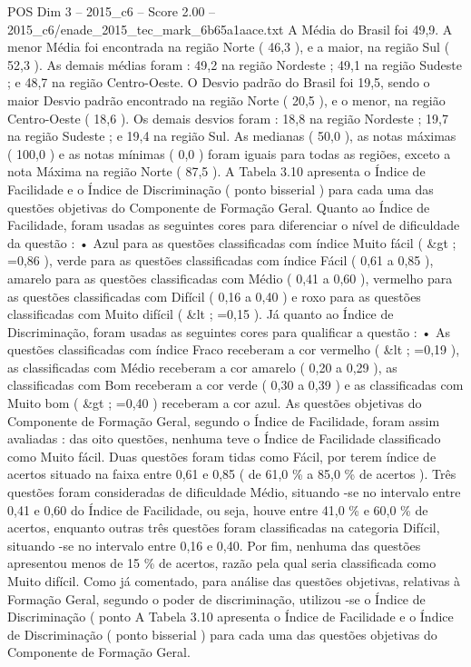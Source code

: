 \begin{textsample}{POS Dim 3 – 2015\_c6 – Score 2.00 – 2015\_c6/enade\_2015\_tec\_mark\_6b65a1aace.txt}
A Média do Brasil foi 49,9.
A menor Média foi encontrada na região Norte ( 46,3 ), e a maior, na região Sul ( 52,3 ).
As demais médias foram : 49,2 na região Nordeste ; 49,1 na região Sudeste ; e 48,7 na região Centro-Oeste.
O Desvio padrão do Brasil foi 19,5, sendo o maior Desvio padrão encontrado na região Norte ( 20,5 ), e o menor, na região Centro-Oeste ( 18,6 ).
Os demais desvios foram : 18,8 na região Nordeste ; 19,7 na região Sudeste ; e 19,4 na região Sul.
As medianas ( 50,0 ), as notas máximas ( 100,0 ) e as notas mínimas ( 0,0 ) foram iguais para todas as regiões, exceto a nota Máxima na região Norte ( 87,5 ).
A Tabela 3.10 apresenta o Índice de Facilidade e o Índice de Discriminação ( ponto bisserial ) para cada uma das questões objetivas do Componente de Formação Geral.
Quanto ao Índice de Facilidade, foram usadas as seguintes cores para diferenciar o nível de dificuldade da questão : • Azul para as questões classificadas com índice Muito fácil ( \&gt ; =0,86 ), verde para as questões classificadas com índice Fácil ( 0,61 a 0,85 ), amarelo para as questões classificadas com Médio ( 0,41 a 0,60 ), vermelho para as questões classificadas com Difícil ( 0,16 a 0,40 ) e roxo para as questões classificadas com Muito difícil ( \&lt ; =0,15 ).
Já quanto ao Índice de Discriminação, foram usadas as seguintes cores para qualificar a questão : • As questões classificadas com índice Fraco receberam a cor vermelho ( \&lt ; =0,19 ), as classificadas com Médio receberam a cor amarelo ( 0,20 a 0,29 ), as classificadas com Bom receberam a cor verde ( 0,30 a 0,39 ) e as classificadas com Muito bom ( \&gt ; =0,40 ) receberam a cor azul.
As questões objetivas do Componente de Formação Geral, segundo o Índice de Facilidade, foram assim avaliadas : das oito questões, nenhuma teve o Índice de Facilidade classificado como Muito fácil.
Duas questões foram tidas como Fácil, por terem índice de acertos situado na faixa entre 0,61 e 0,85 ( de 61,0 \% a 85,0 \% de acertos ).
Três questões foram consideradas de dificuldade Médio, situando -se no intervalo entre 0,41 e 0,60 do Índice de Facilidade, ou seja, houve entre 41,0 \% e 60,0 \% de acertos, enquanto outras três questões foram classificadas na categoria Difícil, situando -se no intervalo entre 0,16 e 0,40.
Por fim, nenhuma das questões apresentou menos de 15 \% de acertos, razão pela qual seria classificada como Muito difícil.
Como já comentado, para análise das questões objetivas, relativas à Formação Geral, segundo o poder de discriminação, utilizou -se o Índice de Discriminação ( ponto A Tabela 3.10 apresenta o Índice de Facilidade e o Índice de Discriminação ( ponto bisserial ) para cada uma das questões objetivas do Componente de Formação Geral.

\end{textsample}
